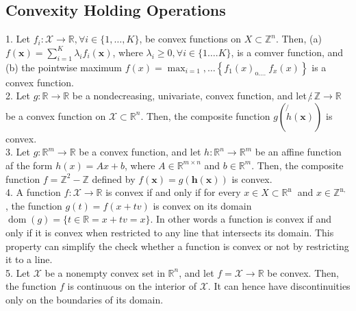 \documentclass[english]{latex4ei_sheet}
\begin{document}
\begin{sectionbox}
\subsection{Convexity Holding Operations}
1. Let $f_{i}: \mathcal{X} \rightarrow \mathbb{R}, \forall i \in\{1, \ldots, K\}$, be convex functions on $X \subset \mathbb{Z}^{n}$. Then,
(a) $f(\boldsymbol{x})=\sum_{i=1}^{K} \lambda_{i} f_{i}(\boldsymbol{x})$, where $\lambda_{i} \geq 0, \forall i \in\{1 \ldots . K\}$, is a comver function, and
(b) the pointwise maximum $f(x)=\max _{i=1}, \ldots\left\{f_{1}(x)_{\text {o.... }} f_{x}(x)\right\}$ is a convex function.\\
2. Let $g: \mathbb{R} \rightarrow \mathbb{R}$ be a nondecreasing, univariate, convex function, and let $\not: \mathbb{Z} \rightarrow \mathbb{R}$ be a convex function on $\mathcal{X} \subset \mathbb{R}^{n}$. Then, the composite function $g(\not{h}(\boldsymbol{x}))$ is convex.\\
3. Let $g: \mathbb{R}^{m} \rightarrow \mathbb{R}$ be a convex function, and let $h: \mathbb{R}^{n} \rightarrow \mathbb{R}^{m}$ be an affine function af the form $h(x)=A x+b$, where $A \in \mathbb{R}^{m \times n}$ and $b \in \mathbb{R}^{m}$. Then, the composite function $f=\mathbb{Z}^{2}-\mathbb{Z}$ defined by $f(\boldsymbol{x})=g(\boldsymbol{h}(\boldsymbol{x}))$ is convex.\\
4. A function $f: \mathcal{X} \rightarrow \mathbb{R}$ is convex if and only if for every $x \in X \subset \mathbb{R}^{\text {n }}$ and $x \in \mathbb{Z}^{\text {n, }}$, the function $g(t)=f(x+t v)$ is convex on its domain $\operatorname{dom}(g)=\{t \in \mathbb{R}=x+t v=x\}$. In other words a function is convex if and only if it is convex when restricted to any line that intersects its domain. This property can simplify the check whether a function is convex or not by restricting it to a line.\\
5. Let $\mathcal{X}$ be a nonempty convex set in $\mathbb{R}^{n}$, and let $f=\mathcal{X} \rightarrow \mathbb{R}$ be convex. Then, the function $f$ is continuous on the interior of $\mathcal{X}$. It can hence have discontinuities only on the boundaries of its domain.\\
\end{sectionbox}
\end{document}

